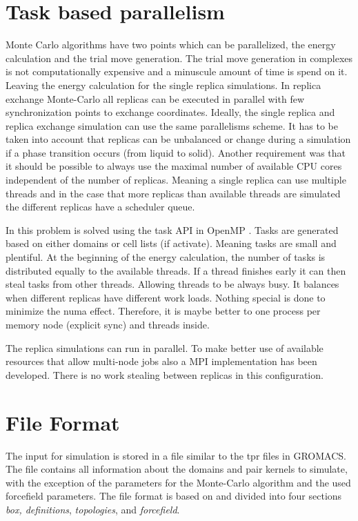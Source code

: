 \documentclass[12pt, twoside]{report}
\begin{document}
\section{Task based parallelism}

Monte Carlo algorithms have two points which can be parallelized, the energy
calculation and the trial move generation. The trial move generation in
complexes is not computationally expensive and a minuscule amount of time is
spend on it. Leaving the energy calculation for the single replica simulations.
In replica exchange Monte-Carlo all replicas can be executed in parallel with
few synchronization points to exchange coordinates. Ideally, the single replica
and replica exchange simulation can use the same parallelisms scheme. It has to
be taken into account that replicas can be unbalanced or change during a
simulation if a phase transition occurs (from liquid to solid). Another
requirement was that it should be possible to always use the maximal number of
available \gls{CPU} cores independent of the number of replicas. Meaning a
single replica can use multiple threads and in the case that more replicas than
available threads are simulated the different replicas have a scheduler queue.

In \complexes this problem is solved using the task \gls{API} in OpenMP
\cite{openMP}. Tasks are generated based on either domains or cell lists (if
activate). Meaning tasks are small and plentiful. At the beginning of the energy
calculation, the number of tasks is distributed equally to the available
threads. If a thread finishes early it can then steal tasks from other threads.
Allowing threads to be always busy. It balances when different replicas have
different work loads. Nothing special is done to minimize the numa effect.
Therefore, it is maybe better to one process per memory node (explicit sync) and
threads inside.

The replica simulations can run in parallel. To make better use of available
resources that allow multi-node jobs also a \gls{MPI} implementation has been
developed. There is no work stealing between replicas in this configuration.

\section{\cplx File Format}

The input for \complexes simulation is stored in a \cplx file similar to the tpr
files in GROMACS. The \cplx file contains all information about the domains and
pair kernels to simulate, with the exception of the parameters for the
Monte-Carlo algorithm and the used forcefield parameters. The \cplx file format
is based on \yaml\cite{YAML} and divided into four sections \textit{box,
definitions}, \textit{topologies}, and \textit{forcefield}.
\end{document}
